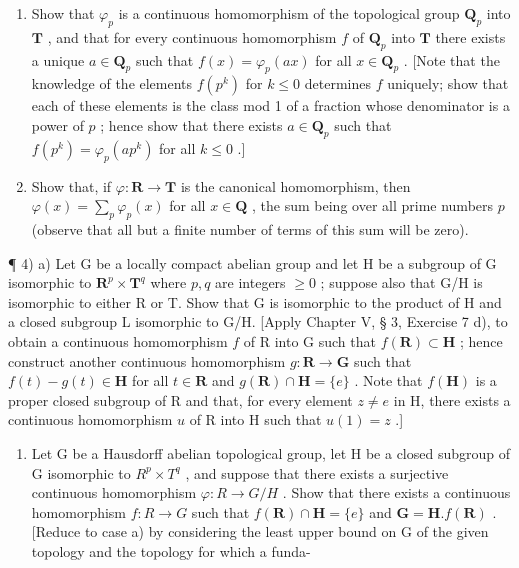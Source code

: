\begin{enumerate}
\def\labelenumi{\alph{enumi})}
\tightlist
\item
  Show that \(\varphi_p\) is a continuous homomorphism of the topological group \(\mathbf{Q}_p\) into \(\mathbf{T}\) , and that for every continuous homomorphism \(f\) of \(\mathbf{Q}_p\) into \(\mathbf{T}\) there exists a unique \(a \in \mathbf{Q}_p\) such that \(f(x) = \varphi_p(ax)\) for all \(x \in \mathbf{Q}_p\) . {[}Note that the knowledge of the elements \(f(p^k)\) for \(k \leqslant 0\) determines \(f\) uniquely; show that each of these elements is the class mod 1 of a fraction whose denominator is a power of \(p\) ; hence show that there exists \(a \in \mathbf{Q}_p\) such that \(f(p^k) = \varphi_p(ap^k)\) for all \(k \leqslant 0\) .{]}\\
\item
  Show that, if \(\varphi: \mathbf{R} \to \mathbf{T}\) is the canonical homomorphism, then \(\varphi(x) = \sum_{p} \varphi_p(x)\) for all \(x \in \mathbf{Q}\) , the sum being over all prime numbers \(p\) (observe that all but a finite number of terms of this sum will be zero).
\end{enumerate}

¶ 4) a) Let G be a locally compact abelian group and let H be a subgroup of G isomorphic to \(\mathbf{R}^{p} \times \mathbf{T}^{q}\) where \(p, q\) are integers \(\geqslant 0\) ; suppose also that G/H is isomorphic to either R or T. Show that G is isomorphic to the product of H and a closed subgroup L isomorphic to G/H. {[}Apply Chapter V, § 3, Exercise 7 d), to obtain a continuous homomorphism \(f\) of R into G such that \(f(\mathbf{R}) \subset \mathbf{H}\) ; hence construct another continuous homomorphism \(g: \mathbf{R} \to \mathbf{G}\) such that \(f(t) - g(t) \in \mathbf{H}\) for all \(t \in \mathbf{R}\) and \(g(\mathbf{R}) \cap \mathbf{H} = \{e\}\) . Note that \(f(\mathbf{H})\) is a proper closed subgroup of R and that, for every element \(z \neq e\) in H, there exists a continuous homomorphism \(u\) of R into H such that \(u(1) = z\) .{]}

\begin{enumerate}
\def\labelenumi{\alph{enumi})}
\setcounter{enumi}{1}
\tightlist
\item
  Let G be a Hausdorff abelian topological group, let H be a closed subgroup of G isomorphic to \(R^{p} \times T^{q}\) , and suppose that there exists a surjective continuous homomorphism \(\varphi: R \to G/H\) . Show that there exists a continuous homomorphism \(f: R \to G\) such that \(f(\mathbf{R}) \cap \mathbf{H} = \{e\}\) and \(\mathbf{G} = \mathbf{H}. f(\mathbf{R})\) . {[}Reduce to case a) by considering the least upper bound on G of the given topology and the topology for which a funda-
\end{enumerate}

